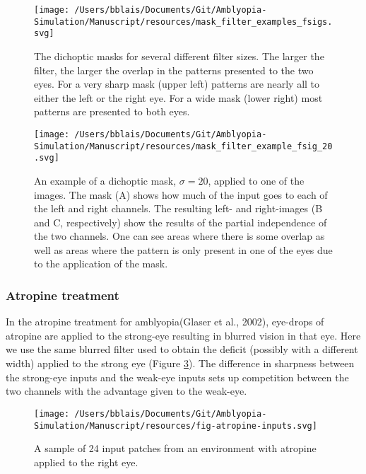 \documentclass[
  onecolumn]{article}
\begin{document}
\begin{figure}
\hypertarget{fig:dichopic_filter_size}{%
\centering
\texttt{[image: /Users/bblais/Documents/Git/Amblyopia-Simulation/Manuscript/resources/mask\_filter\_examples\_fsigs.svg]}
\caption{The dichoptic masks for several different filter sizes. The
larger the filter, the larger the overlap in the patterns presented to
the two eyes. For a very sharp mask (upper left) patterns are nearly all
to either the left or the right eye. For a wide mask (lower right) most
patterns are presented to both eyes.}\label{fig:dichopic_filter_size}
}
\end{figure}

\begin{figure}
\hypertarget{fig:dichopic_filter_image}{%
\centering
\texttt{[image: /Users/bblais/Documents/Git/Amblyopia-Simulation/Manuscript/resources/mask\_filter\_example\_fsig\_20.svg]}
\caption{An example of a dichoptic mask, \(\sigma = 20\), applied to one
of the images. The mask (A) shows how much of the input goes to each of
the left and right channels. The resulting left- and right-images (B and
C, respectively) show the results of the partial independence of the two
channels. One can see areas where there is some overlap as well as areas
where the pattern is only present in one of the eyes due to the
application of the mask.}\label{fig:dichopic_filter_image}
}
\end{figure}

\hypertarget{atropine-treatment}{%
\subsubsection{Atropine treatment}\label{atropine-treatment}}

In the atropine treatment for amblyopia(Glaser et al., 2002), eye-drops
of atropine are applied to the strong-eye resulting in blurred vision in
that eye. Here we use the same blurred filter used to obtain the deficit
(possibly with a different width) applied to the strong eye (Figure
\ref{fig:atropine-inputs}). The difference in sharpness between the
strong-eye inputs and the weak-eye inputs sets up competition between
the two channels with the advantage given to the weak-eye.

\begin{figure}
\hypertarget{fig:atropine-inputs}{%
\centering
\texttt{[image: /Users/bblais/Documents/Git/Amblyopia-Simulation/Manuscript/resources/fig-atropine-inputs.svg]}
\caption{A sample of 24 input patches from an environment with atropine
applied to the right eye.}\label{fig:atropine-inputs}
}
\end{figure}
\end{document}
